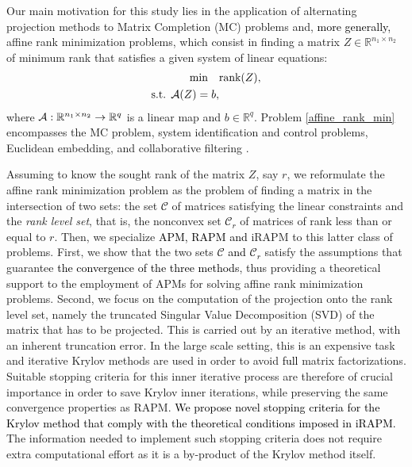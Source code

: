\documentclass[pdflatex,sn-mathphys-num]{sn-jnl}
\numberwithin{equation}{section}%
\def\R{\mathbb{R}}
\newcommand{\REV}[1]{\textcolor{black}{#1}}
\theoremstyle{thmstyleone}%
\theoremstyle{thmstyletwo}%
\theoremstyle{thmstylethree}%
\begin{document}
Our main motivation for this study lies in the application of alternating projection methods to Matrix Completion (MC) problems and, \REV{more generally,} affine rank minimization problems, which consist in finding a matrix $Z\in \R^{n_1\times n_2}$ of minimum rank that satisfies a given system of linear equations:
 \begin{equation}
    \label{affine_rank_min}
    \begin{aligned}
        \min \quad & \textrm{rank}(Z), \\    
        \textrm{s.t. } {\cal A}(Z) = b,
    \end{aligned} 
\end{equation}
where ${\cal A}: \R^{n_1\times n_2}\rightarrow \R^{q} $ is a linear map and $b \in \R^q$. 
Problem \eqref{affine_rank_min} encompasses the MC problem, system identification and control problems, Euclidean embedding, and collaborative filtering \cite{Fazel_review}.
 
Assuming to know the sought rank of the matrix $Z$, say $r$, we reformulate the affine rank minimization problem as the problem of finding a matrix in the intersection of two sets: the set \REV{$\mathcal{C}$} of matrices satisfying the linear constraints and the \textit{rank level set}, that is, the nonconvex set \REV{$\mathcal{C}_r$} of matrices of rank less than or equal to $r$. Then, we specialize \REV{APM, RAPM and} iRAPM to this latter class of problems. First, we show that the two sets \REV{$\mathcal{C}$ and $\mathcal{C}_r$} satisfy the assumptions that guarantee \REV{the convergence of the three methods}, thus providing a theoretical support to the employment of APMs for solving  affine rank minimization problems. Second, we focus on the computation of the projection onto the rank level set, namely the truncated Singular Value Decomposition (SVD) of the matrix that has to be projected. This is carried out by an iterative method, with an inherent truncation error. In the large scale setting, this is an expensive task and iterative Krylov methods are used \cite{saad2011numerical} in order to avoid \REV{full} matrix factorizations. Suitable stopping criteria for this inner iterative process are therefore of crucial importance in order to save Krylov inner iterations, while preserving the same convergence properties as RAPM. \REV{We propose novel stopping criteria for the Krylov method that comply with the theoretical conditions imposed in iRAPM.} The information needed to implement such stopping criteria does not require  extra computational effort as it is a by-product of the Krylov method itself. 
\end{document}
